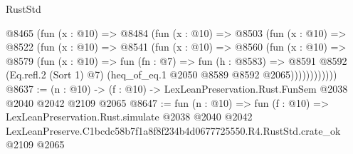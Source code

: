 \begin{lexlean}{RustStd}
\begin{coremodule}
          @8465
            (fun (x : @10) =>
            @8484
              (fun (x : @10) =>
              @8503
                (fun (x : @10) =>
                @8522
                  (fun (x : @10) =>
                  @8541
                    (fun (x : @10) =>
                    @8560
                      (fun (x : @10) =>
                      @8579
                        (fun (x : @10) =>
                        fun (fn : @7) =>
                        fun (h : @8583) =>
                        @8591
                          @8592
                          (Eq.refl.{2} (Sort 1) @7)
                          (heq_of_eq.{1} @2050 @8589 @8592 @2065))))))))))))
@8637 := (n : @10) -> (f : @10) -> LexLeanPreservation.Rust.FunSem @2038 @2040 @2042 @2109 @2065
@8647 := fun (n : @10) =>
  fun (f : @10) =>
  LexLeanPreservation.Rust.simulate
    @2038
    @2040
    @2042
    LexLeanPreserve.C1bcdc58b7f1a8f8f234b4d0677725550.R4.RustStd.crate_ok
    @2109
    @2065
\end{coremodule}
\end{lexlean}
